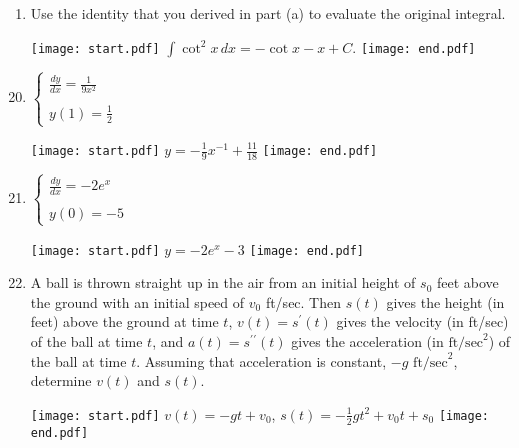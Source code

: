 \documentclass[12pt]{article}
\begin{document}
\begin{enumerate}
\begin{enumerate}
\item Use the identity that you derived in part (a) to evaluate the original integral.

\texttt{[image: start.pdf]}
{{$\int{\cot^{2}{x}} \,dx=-\cot{x}-x+C$.}}
\texttt{[image: end.pdf]}


\end{enumerate}

\end{enumerate}


\begin{enumerate}
\setcounter{enumi}{19}

\item $\left\{\begin{array}{l}
\frac{dy}{dx}=\frac{1}{9x^2}\\
\\
y(1)=\frac{1}{2}
\end{array}\right.$

\texttt{[image: start.pdf]}
{{$y=-\frac{1}{9}x^{-1}+\frac{11}{18}$}}
\texttt{[image: end.pdf]}


\item $\left\{\begin{array}{l}
\frac{dy}{dx}=-2e^{x}\\
\\
y(0)=-5
\end{array}\right.$

\texttt{[image: start.pdf]}
{{$y=-2e^{x}-3$}}
\texttt{[image: end.pdf]}


\item A ball is thrown straight up in the air from an initial height of $s_0$ feet above the ground with an initial speed of $v_0$ ft/sec.  Then $s(t)$ gives the height (in feet) above the ground at time $t$, $v(t)=s^{\prime}(t)$ gives the velocity (in ft/sec) of the ball at time $t$, and $a(t)=s^{\prime \prime}(t)$ gives the acceleration (in $\text{ft/sec}^2$) of the ball at time $t$.  Assuming that acceleration is constant, $-g \text{ ft/sec}^2$, determine $v(t)$ and $s(t)$.

\texttt{[image: start.pdf]}
{{$v(t)=-gt+v_0$, $s(t)=-\frac{1}{2}gt^2+v_0t+s_0$}}
\texttt{[image: end.pdf]}


\end{enumerate}
\end{document}
